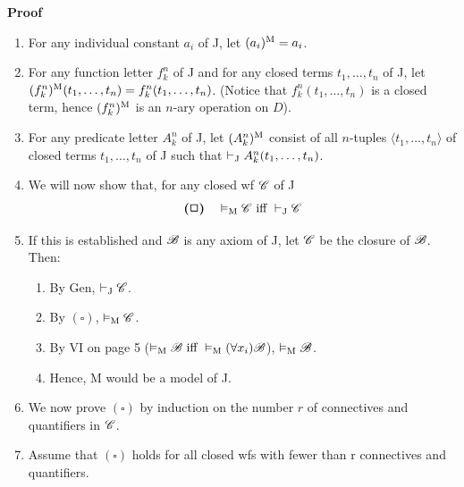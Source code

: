 \textbf{Proof}
\begin{enumerate}
    \item For any individual constant $a_i$ of J, let $(a_i)^{\text{M}} = a_i$.
    \item For any function letter $f_k^n$ of J and for any closed terms $t_1,\dots, t_n$ of J, let $(f_k^n)^{\text{M}}(t_1, \dots, t_n)=f_k^n(t_1,\dots,t_n)$. (Notice that $f_k^n(t_1,\dots,t_n)$ is a closed term, hence $(f_k^n)^{\text{M}}$ is an $n$-ary operation on $D$).
    \item For any predicate letter $A_k^n$ of J, let $(A_k^n)^{\text{M}}$ consist of all $n$-tuples $\langle t_1, \dots, t_n \rangle$ of closed terms $t_1, \dots, t_n$ of J such that $\vdash_\text{J} A_k^n(t_1, \dots, t_n)$.
    \item We will now show that, for any closed wf $\mathscr{C}$ of J
    \[\bm{\bm{(\Box)}} \quad \vDash_\text{M} \mathscr{C} \text{ iff } \vdash_\text{J} \mathscr{C}\]
    \item If this is established and $\mathscr{B}$ is any axiom of J, let $\mathscr{C}$ be the closure of $\mathscr{B}$. Then:
    \begin{enumerate} [label = \roman*.]
        \item By Gen, $\vdash_\text{J} \mathscr{C}$.
        \item By $\bm{(\square)}$, $\vDash_\text{M} \mathscr{C}$.
        \item By VI on page 5 ($\vDash_\text{M} \mathscr{B} \text{ iff } \vDash_\text{M} (\forall x_i) \mathscr{B}$), $\vDash_\text{M} \mathscr{B}$.
        \item Hence, M would be a model of J.
    \end{enumerate}
    \item We now prove $\bm{(\square)}$ by induction on the number $r$ of connectives and quantifiers in $\mathscr{C}$.
    \item Assume that $\bm{(\square)}$ holds for all closed wfs with fewer than r connectives and quantifiers.
\end{enumerate}
